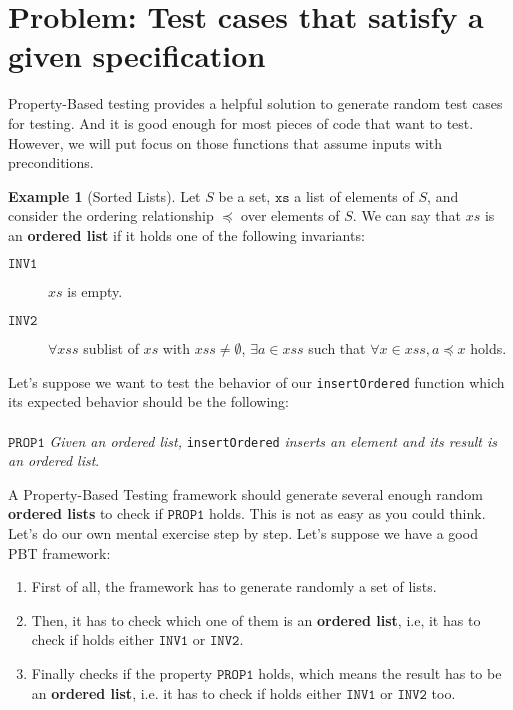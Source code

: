 \documentclass{report}
\theoremstyle{definition}
\newtheorem{example}{Example}[section]
\theoremstyle{definition}
\begin{document}
\section{Problem: Test cases that satisfy a given specification}

Property-Based testing provides a helpful solution to generate random test cases for testing. And it is good enough for most pieces of code that want to test. However, we will put focus on those functions that assume inputs with preconditions.\\
\begin{example}[Sorted Lists]
	Let $S$ be a set, $\mathtt{xs}$ a list of elements of $S$, and consider the ordering relationship $\preceq$ over elements of $S$. We can say that $xs$ is an \textbf{ordered list} if it holds one of the following invariants:
	\begin{description}
		\item[$\mathtt{INV1}$] $xs$ is empty.
		\item[$\mathtt{INV2}$] $\forall xss$ sublist of $xs$ with $xss \neq \emptyset$, $\exists a \in xss$ such that $\forall x \in xss, a \preceq x$ holds.
	\end{description}
	Let's suppose we want to test the behavior of our \texttt{insertOrdered} function which its expected behavior should be the following:\\\\
	$\mathtt{PROP1}$ \textit{Given an ordered list,} \texttt{insertOrdered} \textit{inserts an element and its result is an ordered list}.
	 \pagebreak
	
	A Property-Based Testing framework should generate several enough random \textbf{ordered lists} to check if $\mathtt{PROP1}$ holds. This is not as easy as you could think. Let's do our own mental exercise step by step. Let's suppose we have a good PBT framework:
	\begin{enumerate}
		\item First of all, the framework has to generate randomly a set of lists.
		\item Then, it has to check which one of them is an \textbf{ordered list}, i.e, it has to check if holds either $\mathtt{INV1}$ or $\mathtt{INV2}$.
		\item Finally checks if the property $\mathtt{PROP1}$ holds, which means the result has to be an \textbf{ordered list}, i.e. it has to check if holds either $\mathtt{INV1}$ or $\mathtt{INV2}$ too.

\end{enumerate}
\end{example}
\end{document}

